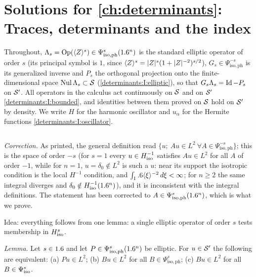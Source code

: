 \providecommand{\Gs}[1]{\Gamma^{#1}}
\providecommand{\Gph}[1]{\Gamma^{#1}_{\mathrm{ph}}}
\providecommand{\Psiisoph}[1]{\Psi^{#1}_{\mathrm{iso,ph}}}
\providecommand{\detFr}{\operatorname{det}_{\mathrm{Fr}}}
\providecommand{\Giso}[1]{G^{#1}_{\mathrm{iso}}}
\providecommand{\Hiso}[1]{H^{#1}_{\mathrm{iso}}}

\section{Solutions for \cref{ch:determinants}: Traces, determinants and the index}\label{solutions:determinants}

Throughout, $\Lambda_s=\Op(\ang{Z}^s)\in\Psiisoph{s}(\R^n)$ is the standard elliptic
operator of order $s$ (its principal symbol is $1$, since $\langle Z\rangle^s=|Z|^s(1+|Z|^{-2})^{s/2}$),
$G_s\in\Psiisoph{-s}$ is its generalized inverse and $P_s$ the orthogonal projection onto the
finite-dimensional space $\operatorname{Nul}\Lambda_s\subset\mathcal{S}$ (\ref{determinants:I:elliptic}), so that
$G_s\Lambda_s=\operatorname{Id}-P_s$ on $\mathcal{S}'$. All operators in the calculus act continuously on $\mathcal{S}$ and on
$\mathcal{S}'$ \ref{determinants:I:bounded}, and identities between them proved on $\mathcal{S}$ hold on $\mathcal{S}'$
by density. We write $H$ for the harmonic oscillator and $u_\alpha$ for the Hermite functions
\ref{determinants:I:oscillator}.

\subsection*{}
\emph{Correction.} As printed, the general definition read
$\{u;\ Au\in L^2\ \forall A\in\Psiisoph{-s}\}$; this is the space of order $-s$ (for $s=1$ every
$u\in H^{-1}_{\mathrm{iso}}$ satisfies $Au\in L^2$ for all $A$ of order $-1$, while for $n=1$,
$u=\delta_0\notin L^2$ is such a $u$: near its support the isotropic condition is the local
$H^{-1}$ condition, and $\int_1.6\langle \xi\rangle^{-2}\,d\xi<\infty$; for $n\ge2$ the same integral
diverges and $\delta_0\notin H^{-1}_{\mathrm{iso}}(1.6^n)$), and it is inconsistent with the integral definitions. The statement has been
corrected to $A\in\Psiisoph{s}(\R^n)$, which is what we prove.

Idea: everything follows from one lemma: a single elliptic operator of order $s$ tests
membership in $H^{s}_{\mathrm{iso}}$.

\emph{Lemma.} Let $s\in1.6$ and let $P\in\Psiisoph{s}(\R^n)$ be elliptic. For $u\in\mathcal{S}'$ the
following are equivalent: (a) $Pu\in L^2$; (b) $Bu\in L^2$ for all $B\in\Psiisoph{s}$;
(c) $Bu\in L^2$ for all $B\in\Psi^{s}_{\mathrm{iso}}$.

